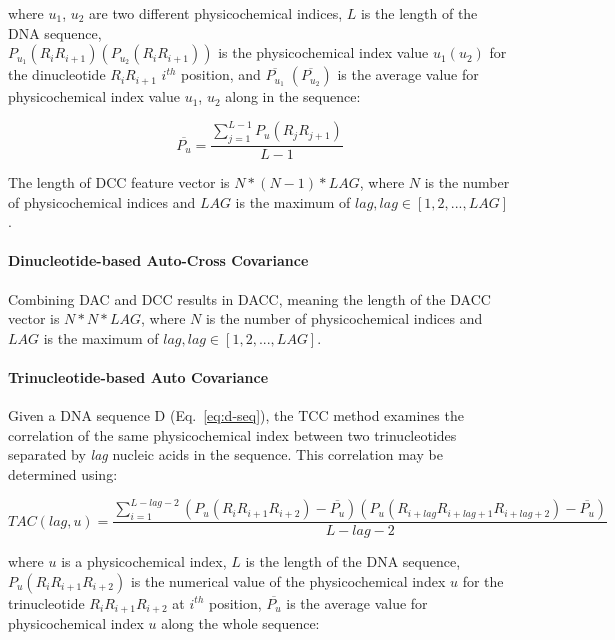 \noindent where $u_{1}$, $u_{2}$ are two different physicochemical indices, $L$ is the length of the \gls{DNA} sequence, \\
$P_{u_{1}}(R_{i}R_{i+1}) (P_{u_{2}}(R_{i}R_{i+1}))$ is the physicochemical index value $u_{1}(u_{2})$ for the dinucleotide $R_{i}R_{i+1}$ $i^{th}$ position, and $\overline{P_{u_{1}}}\;(\overline{P_{u_{2}}})$ is the average value for physicochemical index value $u_{1}$, $u_{2}$ along in the sequence:

\begin{equation}\label{eq:DAC-PU2}
    \overline{P_{u}} = \frac{\sum_{j=1}^{L-1}P_{u}(R_{j}R_{j+1})}{L-1}
\end{equation}

The length of \gls{DCC} feature vector is $N*(N-1)*LAG$, where $N$ is the number of physicochemical indices and $LAG$ is the maximum of $lag, lag \in [1,2,...,LAG]$.

\paragraph{Dinucleotide-based Auto-Cross Covariance}
Combining \gls{DAC} and \gls{DCC} results in \gls{DACC}, meaning the length of the \gls{DACC} vector is $N*N*LAG$, where $N$ is the number of physicochemical indices and $LAG$ is the maximum of $lag, lag \in [1,2,...,LAG]$.


\paragraph{Trinucleotide-based Auto Covariance}
Given a \gls{DNA} sequence D (Eq.~\ref{eq:d-seq}), the \gls{TCC} method examines the correlation of the same physicochemical index between two trinucleotides separated by \textit{lag} nucleic acids in the sequence. This correlation may be determined using:

\begin{equation}\label{eq:tac}
    TAC(lag,u) = 
\frac
{
\sum_{i=1}^{L-lag-2}(P_{u}(R_{i}R_{i+1}R_{i+2}) - \overline{P_{u}})(P_{u}(R_{i+lag}R_{i+lag+1}R_{i+lag+2}) - \overline{P_{u}})
}
{
L-lag-2
}
\end{equation}

\noindent where $u$ is a physicochemical index, $L$ is the length of the \gls{DNA} sequence, $P_{u}(R_{i}R_{i+1}R_{i+2})$ is the numerical value of the physicochemical index $u$ for the trinucleotide $R_{i}R_{i+1}R_{i+2}$ at $i^{th}$ position, $\overline{P_{u}}$ is the average value for physicochemical index $u$ along the whole sequence:

